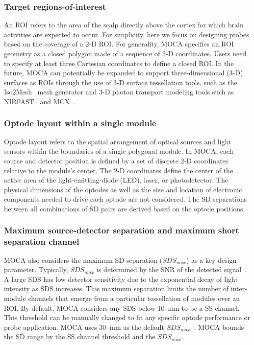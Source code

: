 \subsubsection{Target regions-of-interest}
An \ac{ROI} refers to the area of the scalp directly above the cortex for which brain activities are expected to occur\cite{Hiroyasu2015}. For simplicity, here we focus on designing probes based on the coverage of a 2-D \ac{ROI}. For generality, \ac{MOCA} specifies an \ac{ROI} geometry as a closed polygon made of a sequence of 2-D coordinates. Users need to specify at least three Cartesian coordinates to define a closed \ac{ROI}. In the future, \ac{MOCA} can potentially be expanded to support three-dimensional (3-D) surfaces as \ac{ROI}s through the use of 3-D surface tessellation tools, such as the Iso2Mesh~\cite{Fang2009a} mesh generator and 3-D photon transport modeling tools such as NIRFAST~\cite{Nirfast} and \ac{MCX}~\cite{Fang2009}.

\subsubsection{Optode layout within a single module}
Optode layout refers to the spatial arrangement of optical sources and light sensors within the boundaries of a single polygonal module. In \ac{MOCA}, each source and detector position is defined by a set of discrete 2-D coordinates relative to the module's center. The 2-D coordinates define the center of the active area of the light-emitting-diode (LED), laser, or photodetector. The physical dimensions of the optodes as well as the size and location of electronic components needed to drive each optode are not considered. The \ac{SD} separations between all combinations of \ac{SD} pairs are derived based on the optode positions.

\subsubsection{Maximum source-detector separation and maximum short separation channel}
\ac{MOCA} also considers the maximum \ac{SD} separation ($SDS_{max}$) as a key design parameter. Typically, $SDS_{max}$ is determined by the \ac{SNR} of the detected signal~\cite{Arnulphi2009}. A large \ac{SDS} has low detector sensitivity due to the exponential decay of light intensity as \ac{SDS} increases. This maximum separation limits the number of inter-module channels that emerge from a particular tessellation of modules over an \ac{ROI}. By default, \ac{MOCA} considers any \ac{SDS} below 10~mm to be a \ac{SS} channel. This threshold can be manually changed to fit any specific optode performance or probe application. \ac{MOCA} uses 30~mm as the default $SDS_{max}$~\cite{Taga2007, LloydFox2010}. \ac{MOCA} bounds the \ac{SD} range by the \ac{SS} channel threshold and the $SDS_{max}$. 

